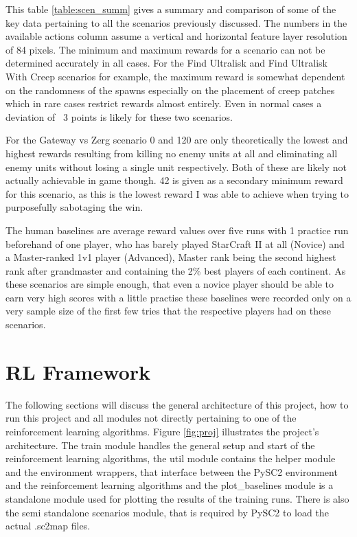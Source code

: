 This table \ref{table:scen_summ} gives a summary and comparison of some of the key data pertaining to all the scenarios previously discussed. The numbers in the available actions column assume a vertical and horizontal feature layer resolution of 84 pixels. The minimum and maximum rewards for a scenario can not be determined accurately in all cases. For the Find Ultralisk and Find Ultralisk With Creep scenarios for example, the maximum reward is somewhat dependent on the randomness of the spawns especially on the placement of creep patches which in rare cases restrict rewards almost entirely. Even in normal cases a deviation of ~3 points is likely for these two scenarios. 

For the Gateway vs Zerg scenario 0 and 120 are only theoretically the lowest and highest rewards resulting from killing no enemy units at all and eliminating all enemy units without losing a single unit respectively. Both of these are likely not actually achievable in game though. 42 is given as a secondary minimum reward for this scenario, as this is the lowest reward I was able to achieve when trying to purposefully sabotaging the win. 

The human baselines are average reward values over five runs with 1 practice run beforehand of one player, who has barely played StarCraft II at all (Novice) and a Master-ranked 1v1 player (Advanced), Master rank being the second highest rank after grandmaster and containing the 2\% best players of each continent. As these scenarios are simple enough, that even a novice player should be able to earn very high scores with a little practise these baselines were recorded only on a very sample size of the first few tries that the respective players had on these scenarios. 

\section{RL Framework}
\label{sec:rlfwork}
The following sections will discuss the general architecture of this project, how to run this project and all modules not directly pertaining to one of the reinforcement learning algorithms. Figure \ref{fig:proj} illustrates the project's architecture.
The train module handles the general setup and start of the reinforcement learning algorithms, the util module contains the helper module and the environment wrappers, that interface between the PySC2 environment and the reinforcement learning algorithms and the plot\_baselines module is a standalone module used for plotting the results of the training runs. There is also the semi standalone scenarios module, that is required by PySC2 to load the actual .sc2map files.



